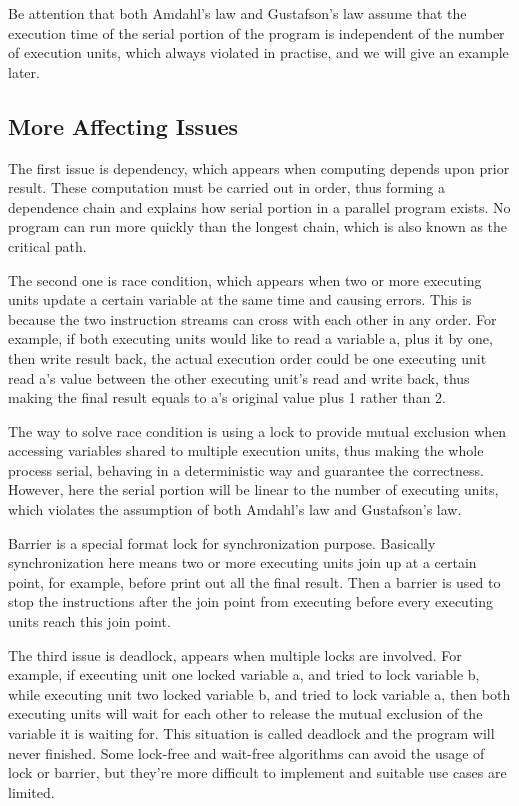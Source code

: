 \documentclass[12pt,a4]{report}
\begin{document}
Be attention that both Amdahl's law and Gustafson's law assume that the execution time of the serial portion of the program is independent of the number of execution units, which always violated in practise, and we will give an example later.

\subsection{More Affecting Issues}

The first issue is dependency, which appears when computing depends upon prior result. These computation must be carried out in order, thus forming a dependence chain and explains how serial portion in a parallel program exists. No program can run more quickly than the longest chain, which is also known as the critical path.

The second one is race condition, which appears when two or more executing units update a certain variable at the same time and causing errors. This is because the two instruction streams can cross with each other in any order. For example, if both executing units would like to read a variable a, plus it by one, then write result back, the actual execution order could be one executing unit read a's value between the other executing unit's read and write back, thus making the final result equals to a's original value plus 1 rather than 2.

The way to solve race condition is using a lock to provide mutual exclusion when accessing variables shared to multiple execution units, thus making the whole process serial, behaving in a deterministic way and guarantee the correctness. However, here the serial portion will be linear to the number of executing units, which violates the assumption of both Amdahl's law and Gustafson's law.

Barrier is a special format lock for synchronization purpose. Basically synchronization here means two or more executing units join up at a certain point, for example, before print out all the final result. Then a barrier is used to stop the instructions after the join point from executing before every executing units reach this join point.

The third issue is deadlock, appears when multiple locks are involved. For example, if executing unit one locked variable a, and tried to lock variable b, while executing unit two locked variable b, and tried to lock variable a, then both executing units will wait for each other to release the mutual exclusion of the variable it is waiting for. This situation is called deadlock and the program will never finished. Some lock-free and wait-free algorithms can avoid the usage of lock or barrier, but they're more difficult to implement and suitable use cases are limited.
\end{document}

